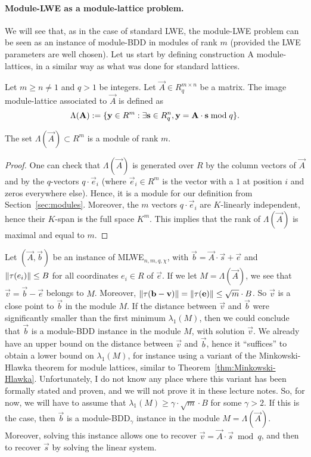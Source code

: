 \paragraph{Module-LWE as a module-lattice problem.} We will see that, as in the case of standard LWE, the module-LWE problem can be seen as an instance of module-BDD in modules of rank $m$ (provided the LWE parameters are well chosen).
Let us start by defining construction A module-lattices, in a similar way as what was done for standard lattices.

\begin{definition}
Let $m \geq n \neq 1$ and $q > 1$ be integers. Let $\vec A \in R_q^{m \times n}$ be a matrix. The image module-lattice associated to $\vec A$ is defined as
\[ \Lambda(\vec A) := \{ \vec y \in R^m: \exists {\bf s} \in R_q^n, {\bf y} = {\bf A}\cdot {\bf s} \bmod q\}.\]
\end{definition}

\begin{lemma}
The set $\Lambda(\vec A) \subset R^m$ is a module of rank $m$.
\end{lemma}

\begin{proof}
One can check that $\Lambda(\vec A)$ is generated over $R$ by the column vectors of $\vec A$ and by the $q$-vectors $q \cdot \vec e_i$ (where $\vec e_i \in R^m$ is the vector with a $1$ at position $i$ and zeros everywhere else). Hence, it is a module for our definition from Section~\ref{sec:modules}.
Moreover, the $m$ vectors $q \cdot \vec e_i$ are $K$-linearly independent, hence their $K$-span is the full space $K^m$. This implies that the rank of $\Lambda(\vec A)$ is maximal and equal to $m$.
\end{proof}

Let $(\vec A, \vec b)$ be an instance of MLWE$_{n,m,q,\chi}$, with $\vec b = \vec A \cdot \vec s + \vec e$ and $\|\mink(e_i)\| \leq B$ for all coordinates $e_i \in R$ of $\vec e$. If we let $M = \Lambda(\vec A)$, we see that $\vec v = \vec b - \vec e$ belongs to $M$. Moreover, $\|\mink(\vec b - \vec v)\| =  \| \mink(\vec e)\| \leq \sqrt{m} \cdot B$. So $\vec v$ is a close point to $\vec b$ in the module $M$. If the distance between $\vec v$ and $\vec b$ were significantly smaller than the first minimum $\lambda_1(M)$, then we could conclude that $\vec b$ is a module-BDD instance in the module $M$, with solution $\vec v$. We already have an upper bound on the distance between $\vec v$ and $\vec b$, hence it ``suffices'' to obtain a lower bound on $\lambda_1(M)$, for instance using a variant of the Minkowski-Hlawka theorem for module lattices, similar to Theorem~\ref{thm:Minkowski-Hlawka}. Unfortunately, I do not know any place where this variant has been formally stated and proven, and we will not prove it in these lecture notes. So, for now, we will have to assume that $\lambda_1(M) \geq \gamma \cdot \sqrt{m} \cdot B $ for some $\gamma >2$. If this is the case, then $\vec b$ is a module-BDD$_\gamma$ instance in the module $M = \Lambda(\vec A)$. Moreover, solving this instance allows one to recover $\vec v = \vec A \cdot \vec s \bmod q$, and then to recover $\vec s$ by solving the linear system.

